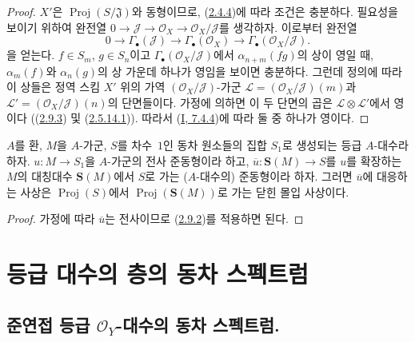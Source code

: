 
\begin{proof}
$X'$은 $\operatorname{Proj}(S/\mathfrak{J})$와 동형이므로,
(\hyperref[II.2.4.4-ko]{2.4.4})에 따라 조건은 충분하다. 필요성을
보이기 위하여 완전열
$0\to\mathcal{J}\to\mathcal{O}_X\to\mathcal{O}_X/\mathcal{J}$를
생각하자. 이로부터 완전열
\[
  0\longrightarrow\Gamma_\bullet(\mathcal{J})
  \longrightarrow\Gamma_\bullet(\mathcal{O}_X)
  \longrightarrow\Gamma_\bullet(\mathcal{O}_X/\mathcal{J}).
\]
을 얻는다. $f\in S_m$, $g\in S_n$이고
$\Gamma_\bullet(\mathcal{O}_X/\mathcal{J})$에서
$\alpha_{n+m}(fg)$의 상이 영일 때, $\alpha_m(f)$와
$\alpha_n(g)$의 상 가운데 하나가 영임을 보이면 충분하다. 그런데
정의에 따라 이 상들은 정역 스킴 $X'$ 위의 가역
$(\mathcal{O}_X/\mathcal{J})$-가군
$\mathcal{L}=(\mathcal{O}_X/\mathcal{J})(m)$과
$\mathcal{L}'=(\mathcal{O}_X/\mathcal{J})(n)$의 단면들이다. 가정에
의하면 이 두 단면의 곱은 $\mathcal{L}\otimes\mathcal{L}'$에서 영이다
((\hyperref[II.2.9.3-ko]{2.9.3}) 및
(\hyperref[II.2.5.14.1-ko]{2.5.14.1})). 따라서
(\hyperref[I.7.4.4-ko]{I, 7.4.4})에 따라 둘 중 하나가 영이다.
\end{proof}

\begin{corollary}[2.9.5]
\label{II.2.9.5-ko}
$A$를 환, $M$을 $A$-가군, $S$를 차수~$1$인 동차 원소들의 집합
$S_1$로 생성되는 등급 $A$-대수라 하자. $u:M\to S_1$을 $A$-가군의
전사 준동형이라 하고, $\overline{u}:\mathbf{S}(M)\to S$를 $u$를
확장하는 $M$의 대칭대수 $\mathbf{S}(M)$에서 $S$로 가는
($A$-대수의) 준동형이라 하자. 그러면 $\overline{u}$에 대응하는 사상은
$\operatorname{Proj}(S)$에서 $\operatorname{Proj}(\mathbf{S}(M))$로
가는 닫힌 몰입 사상이다.
\end{corollary}

\begin{proof}
가정에 따라 $\overline{u}$는 전사이므로
(\hyperref[II.2.9.2-ko]{2.9.2})를 적용하면 된다.
\end{proof}

\section{등급 대수의 층의 동차 스펙트럼}
\label{section:II.3-ko}

\subsection{준연접 등급 $\mathcal{O}_Y$-대수의 동차 스펙트럼.}
\label{subsection:II.3.1-ko}
\label{II.3.1-ko}

